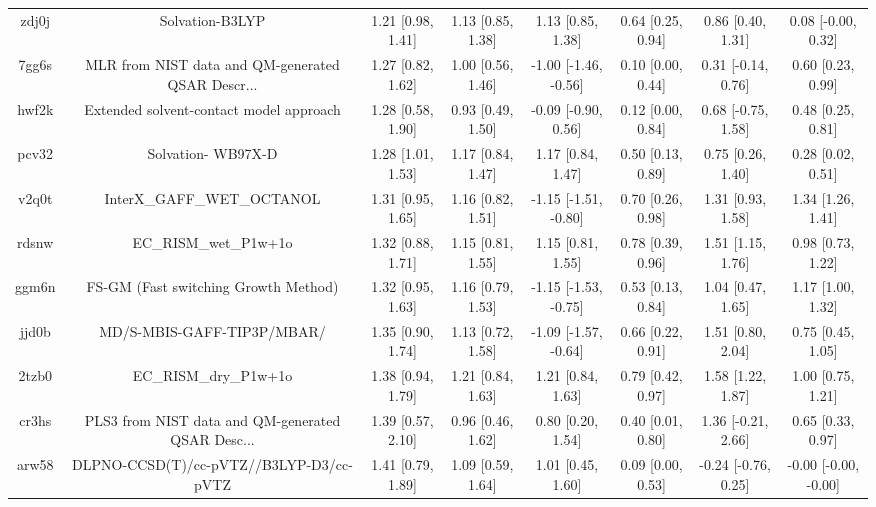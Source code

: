\documentclass{article}
\begin{document}
\begin{center}
\begin{longtable}{|cccccccc|}
 zdj0j &                                    Solvation-B3LYP &  1.21 [0.98, 1.41] &  1.13 [0.85, 1.38] &     1.13 [0.85, 1.38] &  0.64 [0.25, 0.94] &    0.86 [0.40, 1.31] &    0.08 [-0.00, 0.32] \\
 7gg6s &  MLR from NIST data and QM-generated QSAR Descr... &  1.27 [0.82, 1.62] &  1.00 [0.56, 1.46] &  -1.00 [-1.46, -0.56] &  0.10 [0.00, 0.44] &   0.31 [-0.14, 0.76] &     0.60 [0.23, 0.99] \\
 hwf2k &            Extended solvent-contact model approach &  1.28 [0.58, 1.90] &  0.93 [0.49, 1.50] &   -0.09 [-0.90, 0.56] &  0.12 [0.00, 0.84] &   0.68 [-0.75, 1.58] &     0.48 [0.25, 0.81] \\
 pcv32 &                                 Solvation- WB97X-D &  1.28 [1.01, 1.53] &  1.17 [0.84, 1.47] &     1.17 [0.84, 1.47] &  0.50 [0.13, 0.89] &    0.75 [0.26, 1.40] &     0.28 [0.02, 0.51] \\
 v2q0t &                         InterX\_GAFF\_WET\_OCTANOL &  1.31 [0.95, 1.65] &  1.16 [0.82, 1.51] &  -1.15 [-1.51, -0.80] &  0.70 [0.26, 0.98] &    1.31 [0.93, 1.58] &     1.34 [1.26, 1.41] \\
 rdsnw &                              EC\_RISM\_wet\_P1w+1o &  1.32 [0.88, 1.71] &  1.15 [0.81, 1.55] &     1.15 [0.81, 1.55] &  0.78 [0.39, 0.96] &    1.51 [1.15, 1.76] &     0.98 [0.73, 1.22] \\
 ggm6n &               FS-GM (Fast switching Growth Method) &  1.32 [0.95, 1.63] &  1.16 [0.79, 1.53] &  -1.15 [-1.53, -0.75] &  0.53 [0.13, 0.84] &    1.04 [0.47, 1.65] &     1.17 [1.00, 1.32] \\
 jjd0b &                         MD/S-MBIS-GAFF-TIP3P/MBAR/ &  1.35 [0.90, 1.74] &  1.13 [0.72, 1.58] &  -1.09 [-1.57, -0.64] &  0.66 [0.22, 0.91] &    1.51 [0.80, 2.04] &     0.75 [0.45, 1.05] \\
 2tzb0 &                              EC\_RISM\_dry\_P1w+1o &  1.38 [0.94, 1.79] &  1.21 [0.84, 1.63] &     1.21 [0.84, 1.63] &  0.79 [0.42, 0.97] &    1.58 [1.22, 1.87] &     1.00 [0.75, 1.21] \\
 cr3hs &  PLS3 from NIST data and QM-generated QSAR Desc... &  1.39 [0.57, 2.10] &  0.96 [0.46, 1.62] &     0.80 [0.20, 1.54] &  0.40 [0.01, 0.80] &   1.36 [-0.21, 2.66] &     0.65 [0.33, 0.97] \\
 arw58 &            DLPNO-CCSD(T)/cc-pVTZ//B3LYP-D3/cc-pVTZ &  1.41 [0.79, 1.89] &  1.09 [0.59, 1.64] &     1.01 [0.45, 1.60] &  0.09 [0.00, 0.53] &  -0.24 [-0.76, 0.25] &  -0.00 [-0.00, -0.00] \\

\end{longtable}
\end{center}
\end{document}
